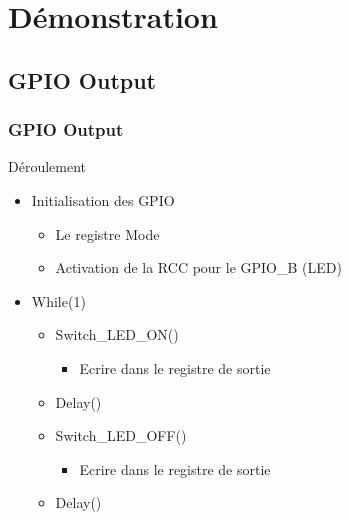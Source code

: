 \documentclass{beamer}
\begin{document}
	
	\section{Démonstration}
		\subsection{GPIO Output}
			\begin{frame}
				\frametitle{GPIO Output}
				\begin{block}{ Déroulement }
					\begin{itemize}
						\item Initialisation des GPIO
							\begin{itemize}
								\item Le registre Mode
								\item Activation de la RCC pour le GPIO\_B (LED)
							\end{itemize}
						\item While(1)
							\begin{itemize}
								\item Switch\_LED\_ON()
									\begin{itemize}
										\item Ecrire dans le registre de sortie
									\end{itemize}
								\item Delay()
								\item Switch\_LED\_OFF()
									\begin{itemize}
										\item Ecrire dans le registre de sortie
									\end{itemize}
								\item Delay()
							\end{itemize}
					\end{itemize}
				\end{block}
			\end{frame}
			
			
			
\end{document}
